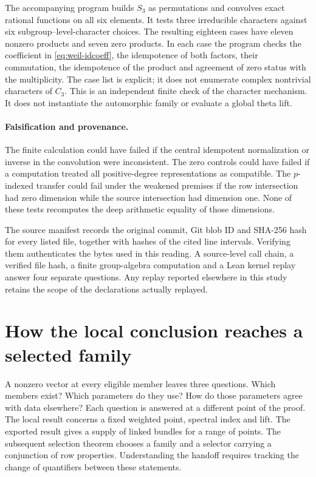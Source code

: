 \documentclass[12pt,letterpaper]{article}
\begin{document}
The accompanying program builds \(S_3\) as permutations and convolves exact rational functions on all six elements. It tests three irreducible characters against six subgroup--level-character choices. The resulting eighteen cases have eleven nonzero products and seven zero products. In each case the program checks the coefficient in \eqref{eq:weil-idcoeff}, the idempotence of both factors, their commutation, the idempotence of the product and agreement of zero status with the multiplicity. The case list is explicit; it does not enumerate complex nontrivial characters of \(C_3\). This is an independent finite check of the character mechanism. It does not instantiate the automorphic family or evaluate a global theta lift.

\paragraph{Falsification and provenance.}
The finite calculation could have failed if the central idempotent normalization or inverse in the convolution were inconsistent. The zero controls could have failed if a computation treated all positive-degree representations as compatible. The \(p\)-indexed transfer could fail under the weakened premises if the row intersection had zero dimension while the source intersection had dimension one. None of these tests recomputes the deep arithmetic equality of those dimensions.

The source manifest records the original commit, Git blob ID and SHA-256 hash for every listed file, together with hashes of the cited line intervals. Verifying them authenticates the bytes used in this reading. A source-level call chain, a verified file hash, a finite group-algebra computation and a Lean kernel replay answer four separate questions. Any replay reported elsewhere in this study retains the scope of the declarations actually replayed.


\section{How the local conclusion reaches a selected family}
\label{sec:weil-handoff}
\newcommand{\Wthird}{Development/AutomorphicArithmetic/ThetaCorrespondence/ThetaPairLifts/ThirdPlaceSeries}
\newcommand{\Wtw}{Development/AbelianVarietyTheory/Definitions/GlobalTwisting}
\newcommand{\WBref}[3]{\href{https://github.com/nousentllc/riemann-hypothesis/blob/40e56bab026552e089d7afcfeff08d2defb9c005/src/#1.lean\#L#2}{#3}}
\newcommand{\wcode}[1]{\nolinkurl{#1}}
A nonzero vector at every eligible member leaves three questions. Which members exist? Which parameters do they use? How do those parameters agree with data elsewhere? Each question is answered at a different point of the proof. The local result concerns a fixed weighted point, spectral index and lift. The exported result gives a supply of linked bundles for a range of points. The subsequent selection theorem chooses a family and a selector carrying a conjunction of row properties. Understanding the handoff requires tracking the change of quantifiers between these statements.
\end{document}
